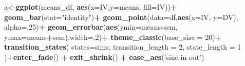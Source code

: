 \documentclass[]{book}
\newenvironment{Shaded}{\begin{snugshade}}{\end{snugshade}}
\newcommand{\DataTypeTok}[1]{\textcolor[rgb]{0.13,0.29,0.53}{#1}}
\newcommand{\DecValTok}[1]{\textcolor[rgb]{0.00,0.00,0.81}{#1}}
\newcommand{\KeywordTok}[1]{\textcolor[rgb]{0.13,0.29,0.53}{\textbf{#1}}}
\newcommand{\NormalTok}[1]{#1}
\newcommand{\OperatorTok}[1]{\textcolor[rgb]{0.81,0.36,0.00}{\textbf{#1}}}
\newcommand{\StringTok}[1]{\textcolor[rgb]{0.31,0.60,0.02}{#1}}
\begin{document}
\begin{Shaded}
\begin{Highlighting}[]
{{{{\NormalTok{a<-}\KeywordTok{ggplot}\NormalTok{(means_df, }\KeywordTok{aes}\NormalTok{(}\DataTypeTok{x=}\NormalTok{IV,}\DataTypeTok{y=}\NormalTok{means, }\DataTypeTok{fill=}\NormalTok{IV))}\OperatorTok{+}
\StringTok{  }\KeywordTok{geom_bar}\NormalTok{(}\DataTypeTok{stat=}\StringTok{"identity"}\NormalTok{)}\OperatorTok{+}
\StringTok{  }\KeywordTok{geom_point}\NormalTok{(}\DataTypeTok{data=}\NormalTok{df,}\KeywordTok{aes}\NormalTok{(}\DataTypeTok{x=}\NormalTok{IV, }\DataTypeTok{y=}\NormalTok{DV), }\DataTypeTok{alpha=}\NormalTok{.}\DecValTok{25}\NormalTok{)}\OperatorTok{+}
\StringTok{  }\KeywordTok{geom_errorbar}\NormalTok{(}\KeywordTok{aes}\NormalTok{(}\DataTypeTok{ymin=}\NormalTok{means}\OperatorTok{-}\NormalTok{sem, }\DataTypeTok{ymax=}\NormalTok{means}\OperatorTok{+}\NormalTok{sem),}\DataTypeTok{width=}\NormalTok{.}\DecValTok{2}\NormalTok{)}\OperatorTok{+}
\StringTok{  }\KeywordTok{theme_classic}\NormalTok{(}\DataTypeTok{base_size =} \DecValTok{20}\NormalTok{)}\OperatorTok{+}
\StringTok{  }\KeywordTok{transition_states}\NormalTok{(}
    \DataTypeTok{states=}\NormalTok{sims,}
    \DataTypeTok{transition_length =} \DecValTok{2}\NormalTok{,}
    \DataTypeTok{state_length =} \DecValTok{1}
\NormalTok{  )}\OperatorTok{+}\KeywordTok{enter_fade}\NormalTok{() }\OperatorTok{+}\StringTok{ }
\StringTok{  }\KeywordTok{exit_shrink}\NormalTok{() }\OperatorTok{+}
\StringTok{  }\KeywordTok{ease_aes}\NormalTok{(}\StringTok{'sine-in-out'}\NormalTok{)}

}}}}
\end{Highlighting}
\end{Shaded}
\end{document}
